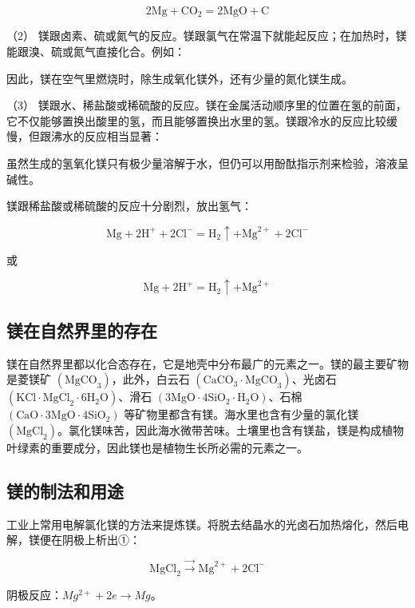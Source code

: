 \[
2 \mathrm{Mg} + \mathrm{CO} _ {2} = 2 \mathrm{MgO} + \mathrm{C}
\]

（2）
镁跟卤素、硫或氮气的反应。镁跟氯气在常温下就能起反应；在加热时，镁能跟溴、硫或氮气直接化合。例如：

因此，镁在空气里燃烧时，除生成氧化镁外，还有少量的氮化镁生成。

（3）
镁跟水、稀盐酸或稀硫酸的反应。镁在金属活动顺序里的位置在氢的前面，它不仅能够置换出酸里的氢，而且能够置换出水里的氢。镁跟冷水的反应比较缓慢，但跟沸水的反应相当显著：

虽然生成的氢氧化镁只有极少量溶解于水，但仍可以用酚酞指示剂来检验，溶液呈碱性。

镁跟稀盐酸或稀硫酸的反应十分剧烈，放出氢气：

\[
\mathrm{Mg} + 2 \mathrm{H} ^ {+} + 2 \mathrm{Cl} ^ {-} = \mathrm{H} _ {2} \uparrow + \mathrm{Mg} ^{2+} + 2 \mathrm{Cl} ^ {-}
\]

或

\[
\mathrm{Mg} + 2 \mathrm{H} ^ {+} = \mathrm{H} _ {2} \uparrow + \mathrm{Mg} ^{2+}
\]

\subsection{镁在自然界里的存在}

镁在自然界里都以化合态存在，它是地壳中分布最广的元素之一。镁的最主要矿物是菱镁矿
\(\left(\mathrm{MgCO}_{3}\right)\)，此外，白云石
\(\left(\mathrm{CaCO}_{3}\cdot\mathrm{MgCO}_{3}\right)\)、光卤石
\(\left(\mathrm{KCl}\cdot\mathrm{MgCl}_{2}\cdot6\mathrm{H}_{2}\mathrm{O}\right)\)、滑石
\(\left(3\mathrm{MgO}\cdot4\mathrm{SiO}_{2}\cdot\mathrm{H}_{2}\mathrm{O}\right)\)、石棉
\(\left(\mathrm{CaO}\cdot3\mathrm{MgO}\cdot4\mathrm{SiO}_{2}\right)\)
等矿物里都含有镁。海水里也含有少量的氯化镁
\(\left(\mathrm{MgCl}_{2}\right)\)。氯化镁味苦，因此海水微带苦味。土壤里也含有镁盐，镁是构成植物叶绿素的重要成分，因此镁也是植物生长所必需的元素之一。

\subsection{镁的制法和用途}

工业上常用电解氯化镁的方法来提炼镁。将脱去结晶水的光卤石加热熔化，然后电解，镁便在阴极上析出①：

\[
\mathrm{MgCl} _ {2} \xrightarrow {\longrightarrow} \mathrm{Mg} ^{2+} + 2 \mathrm{Cl} ^ {-}
\]

阴极反应：\(Mg^{2+} + 2e \longrightarrow Mg\)。

